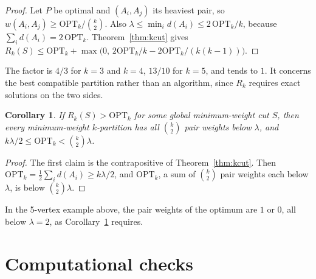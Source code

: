 \documentclass[preprint,12pt]{elsarticle}
\newtheorem{corollary}[theorem]{Corollary}
\theoremstyle{definition}
\newcommand{\OPT}{\mathrm{OPT}}
\begin{document}
\begin{proof}
Let $P$ be optimal and $(A_i,A_j)$ its heaviest pair, so $w(A_i,A_j)\ge\OPT_k/\binom k2$. Also
$\lambda\le\min_i d(A_i)\le 2\,\OPT_k/k$, because $\sum_i d(A_i)=2\,\OPT_k$. Theorem~\ref{thm:kcut} gives
$R_k(S)\le\OPT_k+\max\bigl(0,\,2\OPT_k/k-2\OPT_k/(k(k-1))\bigr)$.
\end{proof}

The factor is $4/3$ for $k=3$ and $k=4$, $13/10$ for $k=5$, and tends to $1$. It concerns the best
compatible partition rather than an algorithm, since $R_k$ requires exact solutions on the two sides.

\begin{corollary}\label{cor:khard}
If $R_k(S)>\OPT_k$ for some global minimum-weight cut $S$, then every minimum-weight $k$-partition has
all $\binom k2$ pair weights below $\lambda$, and $k\lambda/2\le\OPT_k<\binom k2\lambda$.
\end{corollary}

\begin{proof}
The first claim is the contrapositive of Theorem~\ref{thm:kcut}. Then
$\OPT_k=\tfrac12\sum_i d(A_i)\ge k\lambda/2$, and $\OPT_k$, a sum of $\binom k2$ pair weights each below
$\lambda$, is below $\binom k2\lambda$.
\end{proof}

In the 5-vertex example above, the pair weights of the optimum are $1$ or $0$, all below $\lambda=2$,
as Corollary~\ref{cor:khard} requires.

\section{Computational checks}\label{sec:comp}
\end{document}
